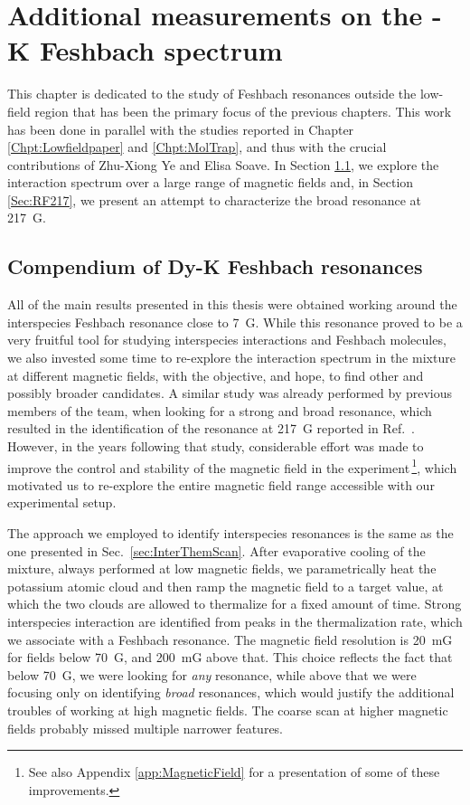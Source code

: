 \chapter{Additional measurements on the \Dy-K Feshbach spectrum}
\label{Chpt:AddDyKRes}

This chapter is dedicated to the study of Feshbach resonances outside the low-field region that has been the primary focus of the previous chapters. This work has been done in parallel with the studies reported in Chapter \ref{Chpt:Lowfieldpaper} and \ref{Chpt:MolTrap}, and thus with the crucial contributions of Zhu-Xiong Ye and Elisa Soave. In Section \ref{Sec:Compendium}, we explore the interaction spectrum over a large range of magnetic fields and, in Section \ref{Sec:RF217}, we present an attempt to characterize the broad resonance at \SI{217}{G}.



\section{Compendium of  D\lowercase{y}-K Feshbach resonances}
\label{Sec:Compendium}

All of the main results presented in this thesis were obtained working around the interspecies Feshbach resonance close to \SI{7}{G}. While this resonance proved to be a very fruitful tool for studying interspecies interactions and Feshbach molecules, we also invested some time to re-explore the interaction spectrum in the mixture at different magnetic fields, with the objective, and hope, to find other and possibly broader candidates. A similar study was already performed by  previous members of the team, when looking for a strong and broad resonance, which resulted in the identification of the resonance at \SI{217}{G} reported in Ref.~\cite{Ravensbergen2020rif}. However, in the years following that study, considerable effort was made to improve the control and stability of the magnetic field in the experiment\,\footnote{See also Appendix \ref{app:MagneticField} for a presentation of some of these improvements.}, which motivated us to re-explore the entire magnetic field range accessible with our experimental setup.

The approach we employed to identify interspecies resonances is the same as the one presented in Sec.~\ref{sec:InterThemScan}. After evaporative cooling of the mixture, always performed at low magnetic fields, we parametrically heat the potassium atomic cloud and then ramp the magnetic field to a target value, at which the two clouds are allowed to thermalize for a fixed amount of time. Strong interspecies interaction are identified from peaks in the thermalization rate, which we associate with a Feshbach resonance. The magnetic field resolution is \SI{20}{mG} for fields below \SI{70}{G}, and \SI{200}{mG} above that. This choice reflects the fact that below \SI{70}{G}, we were looking for \textit{any} resonance, while above that we were focusing only on identifying \textit{broad} resonances, which would justify the additional troubles of working at high magnetic fields. The coarse scan at higher magnetic fields probably missed multiple narrower features.

